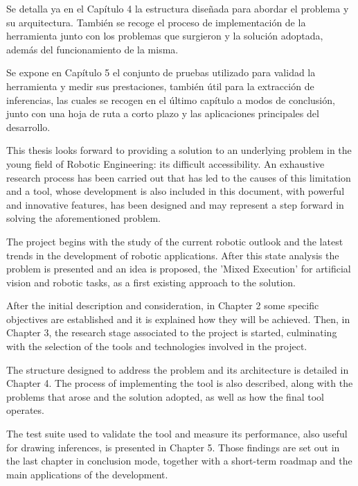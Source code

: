 \documentclass[11pt,a4paper,twoside]{book}
\begin{document}
Se detalla ya en el Capítulo 4 la estructura diseñada para abordar el problema y su arquitectura. También se recoge el proceso de implementación de la herramienta junto con los problemas que surgieron y la solución adoptada, además del funcionamiento de la misma.

Se expone en Capítulo 5 el conjunto de pruebas utilizado para validad la herramienta y medir sus prestaciones, también útil para la extracción de inferencias, las cuales se recogen en el último capítulo a modos de conclusión, junto con una hoja de ruta a corto plazo y las aplicaciones principales del desarrollo.

This thesis looks forward to providing a solution to an underlying problem in the young field of Robotic Engineering: its difficult accessibility. An exhaustive research process has been carried out that has led to the causes of this limitation and a tool, whose development is also included in this document, with powerful and innovative features, has been designed and may represent a step forward in solving the aforementioned problem. 

The project begins with the study of the current robotic outlook and the latest trends in the development of robotic applications. After this state analysis the problem is presented and an idea is proposed, the 'Mixed Execution' for artificial vision and robotic tasks, as a first existing approach to the solution.

After the initial description and consideration, in Chapter 2 some specific objectives are established and it is explained how they will be achieved. Then, in Chapter 3, the research stage associated to the project is started, culminating with the selection of the tools and technologies involved in the project.

The structure designed to address the problem and its architecture is detailed in Chapter 4. The process of implementing the tool is also described, along with the problems that arose and the solution adopted, as well as how the final tool operates.

The test suite used to validate the tool and measure its performance, also useful for drawing inferences, is presented in Chapter 5. Those findings are set out in the last chapter in conclusion mode, together with a short-term roadmap and the main applications of the development.

	\cleardoublepage
    	\afterpreface

	\pagestyle{fancyplain}
	\renewcommand{\chaptermark}[1] %
	{\markboth{#1}{\thechapter\ #1}}
	\renewcommand{\sectionmark}[1]%
	{\markright{\thesection\ #1}}
	\lhead[\fancyplain{}{\bfseries\thepage}]
	{\fancyplain{}{\bfseries\rightmark}}
	\rhead[\fancyplain{}{\bfseries\leftmark}] {\fancyplain{}{\bfseries\thepage}}
	\cfoot{}
	
	
	
	
	
	
    

\nocite{*}


		
\end{document}
